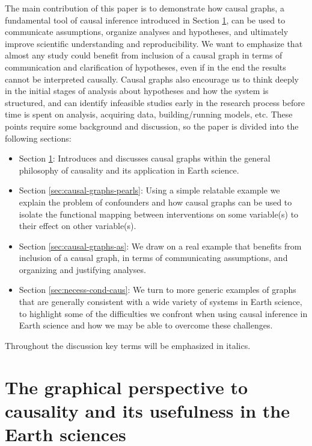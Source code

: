 \documentclass[12pt]{article}
\begin{document}
The main contribution of this paper is to demonstrate how causal
graphs, a fundamental tool of causal inference introduced in Section
\ref{sec:what-caus-caus}, can be used to communicate assumptions,
organize analyses and hypotheses, and ultimately improve scientific
understanding and reproducibility. We want to emphasize that almost
any study could benefit from inclusion of a causal graph in terms of
communication and clarification of hypotheses, even if in the end the
results cannot be interpreted causally. Causal graphs also encourage
us to think deeply in the initial stages of analysis about hypotheses
and how the system is structured, and can identify infeasible studies
early in the research process before time is spent on analysis,
acquiring data, building/running models, etc. These points require
some background and discussion, so the paper is divided into the
following sections:

\begin{itemize}
\item Section \ref{sec:what-caus-caus}: Introduces and discusses
  causal graphs within the general philosophy of causality and its
  application in Earth science.
\item Section \ref{sec:causal-graphs-pearls}: Using a simple relatable
  example we explain the problem of confounders and how causal graphs
  can be used to isolate the functional mapping between interventions
  on some variable(s) to their effect on other variable(s).
\item Section \ref{sec:causal-graphs-as}: We draw on a real example
  that benefits from inclusion of a causal graph, in terms of
  communicating assumptions, and organizing and justifying analyses.
\item Section \ref{sec:necess-cond-caus}: We turn to more generic
  examples of graphs that are generally consistent with a wide variety
  of systems in Earth science, to highlight some of the difficulties
  we confront when using causal inference in Earth science and how we
  may be able to overcome these challenges.
\end{itemize}

Throughout the discussion key terms will be emphasized in italics.

\section{The graphical
  perspective to causality and its usefulness in the Earth
  sciences}\label{sec:what-caus-caus}
\end{document}
